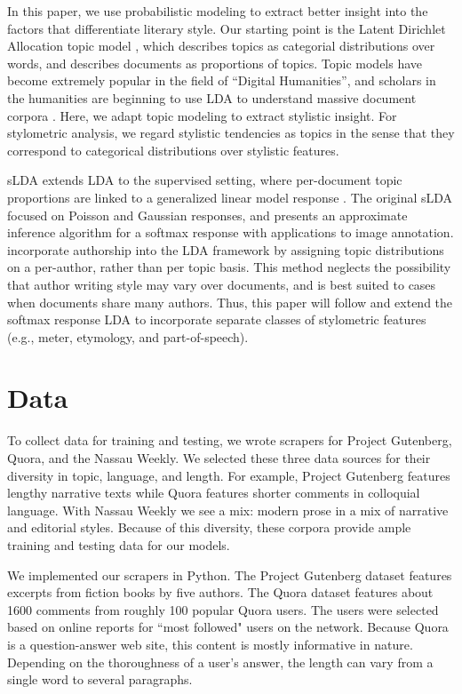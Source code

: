 \documentclass[14pt]{article} %
\theoremstyle{plain}
\theoremstyle{definition}
\theoremstyle{remark}
\begin{document}
	In this paper, we use probabilistic modeling to extract better insight into the factors that differentiate literary style. Our starting point is the Latent Dirichlet Allocation topic model \cite{Blei2003}, which describes topics as categorial distributions over words, and describes documents as proportions of topics. Topic models have become extremely popular in the field of ``Digital Humanities'', and scholars in the humanities are beginning to use LDA to understand massive document corpora \cite{blei2012topic}. Here, we adapt topic modeling to extract stylistic insight. For stylometric analysis, we regard stylistic tendencies as topics in the sense that they correspond to categorical distributions over stylistic features.

	sLDA \cite{Blei2007} extends LDA to the supervised setting, where per-document topic proportions are linked to a generalized linear model response \cite{mccullagh1984generalized}. The original sLDA focused on Poisson and Gaussian responses, and \cite{wang2009simultaneous} presents an approximate inference algorithm for a softmax response with applications to image annotation. \citet{rosen2004author} incorporate authorship into the LDA framework by assigning topic distributions on a per-author, rather than per topic basis. This method neglects the possibility that author writing style may vary over documents, and is best suited to cases when documents share many authors. Thus, this paper will follow  \citet{wang2009simultaneous} and extend the softmax response LDA to incorporate separate classes of stylometric features (e.g., meter, etymology, and part-of-speech). 
 
\section{Data}
To collect data for training and testing, we wrote scrapers for Project Gutenberg, Quora, and the Nassau Weekly. We selected these three data sources for their diversity in topic, language, and length. For example, Project Gutenberg features lengthy narrative texts while Quora features shorter comments in colloquial language. With Nassau Weekly we see a mix: modern prose in a mix of narrative and editorial styles. Because of this diversity, these corpora provide ample training and testing data for our models.

We implemented our scrapers in Python. The Project Gutenberg dataset features excerpts from fiction books by five authors. The Quora dataset features about 1600 comments from roughly 100 popular Quora users. The users were selected based on online reports for ``most followed" users on the network. Because Quora is a question-answer web site, this content is mostly informative in nature. Depending on the thoroughness of a user's answer, the length can vary from a single word to several paragraphs.
\end{document}
